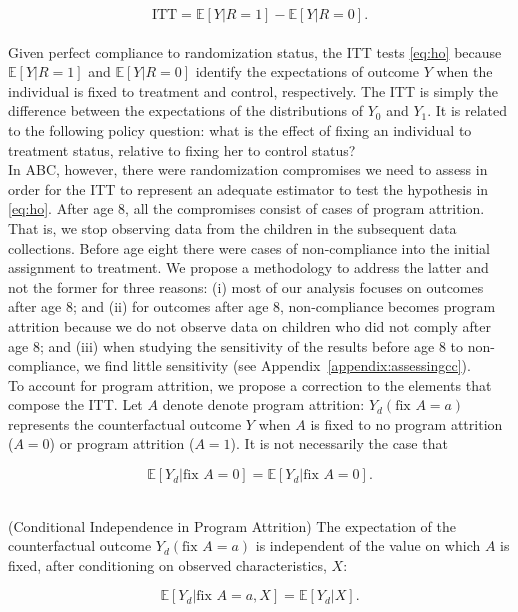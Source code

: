 \begin{equation}
\text{ITT} = \mathbb{E} \left[ Y | R = 1 \right] - \mathbb{E} \left[ Y | R = 0 \right]. \label{eq:itt}
\end{equation}\\ 

\noindent Given perfect compliance to randomization status, the ITT tests \eqref{eq:ho} because $\mathbb{E} \left[ Y | R = 1 \right]$ and $\mathbb{E} \left[ Y | R = 0 \right]$ identify the expectations of outcome $Y$ when the individual is fixed to treatment and control, respectively. The ITT is simply the difference between the expectations of the distributions of $Y_{0}$ and $Y_{1}$. It is related to the following policy question: what is the effect of fixing an individual to treatment status, relative to fixing her to control status?\\

\noindent In ABC, however, there were randomization compromises we need to assess in order for the ITT to represent an adequate estimator to test the hypothesis in \eqref{eq:ho}. After age 8, all the compromises consist of cases of program attrition. That is, we stop observing data from the children in the subsequent data collections. Before age eight there were cases of non-compliance into the initial assignment to treatment. We propose a methodology to address the latter and not the former for three reasons: (i) most of our analysis focuses on outcomes after age 8; and (ii) for outcomes after age 8, non-compliance becomes program attrition because we do not observe data on children who did not comply after age 8; and (iii) when studying the sensitivity of the results before age 8 to non-compliance, we find little sensitivity (see Appendix~\ref{appendix:assessingcc}).\\

\noindent To account for program attrition, we propose a correction to the elements that compose the ITT. Let $A$ denote denote program attrition: $Y_{d} \left(\text{fix } A = a \right)$ represents the counterfactual outcome $Y$ when $A$ is fixed to no program attrition ($A = 0$) or program attrition ($A = 1$). It is not necessarily the case that 

\begin{equation}
\mathbb{E} \left[ Y_{d} | \text{fix } A = 0 \right]  = \mathbb{E} \left[ Y_{d} | \text{fix } A = 0  \right].
\end{equation}\\

\begin{assumption} \normalfont \label{assumption:balance} (Conditional Independence in Program Attrition) The expectation of the counterfactual outcome $Y_{d} \left(\text{fix } A = a \right)$ is independent of the value on which $A$ is fixed, after conditioning on observed characteristics, $X$: 

\begin{equation}
\mathbb{E} \left[ Y_{d} | \text{fix } A = a, X \right] = \mathbb{E} \left[ Y_{d} | X \right].
\end{equation}

\end{assumption}

